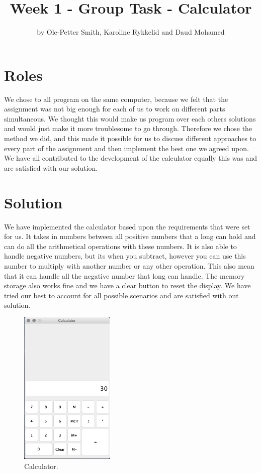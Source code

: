 \documentclass[]{report}
\title{Week 1 - Group Task - Calculator}
\author{by Ole-Petter Smith, Karoline Rykkelid and Daud Mohamed}
\begin{document}
\maketitle

\section*{Roles}

We chose to all program on the same computer, because we felt that the assignment was not big enough for each of us to work on different parts simultaneous. We thought this would make us program over each others solutions and would just make it more troublesome to go through. Therefore we chose the method we did, and this made it possible for us to discuss different approaches to every part of the assignment and then implement the best one we agreed upon. We have all contributed to the development of the calculator equally this was and are satisfied with our solution.

\section*{Solution}

We have implemented the calculator based upon the requirements that were set for us. It takes in numbers between all positive numbers that a long can hold and can do all the arithmetical operations with these numbers. It is also able to handle negative numbers, but its when you subtract, however you can use this number to multiply with another number or any other operation. This also mean that it can handle all the negative number that long can handle. The memory storage also works fine and we have a clear button to reset the display. We have tried our best to account for all possible scenarios and are satisfied with out solution.

\begin{figure}[h]
	\includegraphics[width=0.4\textwidth, right]{calc_img.png}
	\caption{Calculator.}
	\label{fig:boat1}
\end{figure}
\end{document}

